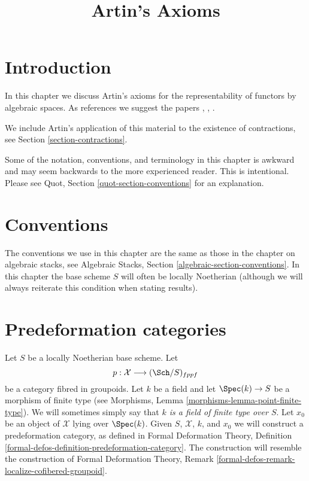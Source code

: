 

%


\title{Artin's Axioms}

\maketitle

\label{section-phantom}

\tableofcontents




\section{Introduction}
\label{section-introduction}

\noindent
In this chapter we discuss Artin's axioms for the representability of
functors by algebraic spaces. As references we suggest the papers
\cite{ArtinI}, \cite{ArtinII}, \cite{ArtinVersal}.

\medskip\noindent
We include Artin's application of this material to the existence
of contractions, see Section \ref{section-contractions}.

\medskip\noindent
Some of the notation, conventions, and terminology in this chapter is awkward
and may seem backwards to the more experienced reader. This is intentional.
Please see Quot, Section \ref{quot-section-conventions} for an
explanation.






\section{Conventions}
\label{section-conventions}

\noindent
The conventions we use in this chapter are the same as those in the
chapter on algebraic stacks, see
Algebraic Stacks, Section \ref{algebraic-section-conventions}.
In this chapter the base scheme $S$ will often be locally Noetherian
(although we will always reiterate this condition when stating
results).





\section{Predeformation categories}
\label{section-predeformation-categories}

\noindent
Let $S$ be a locally Noetherian base scheme. Let
$$
p : \mathcal{X} \longrightarrow (\Sch/S)_{fppf}
$$
be a category fibred in groupoids. Let $k$ be a field
and let $\Spec(k) \to S$ be a morphism of finite type (see
Morphisms, Lemma \ref{morphisms-lemma-point-finite-type}). We will sometimes
simply say that {\it $k$ is a field of finite type over $S$}. Let
$x_0$ be an object of $\mathcal{X}$ lying over $\Spec(k)$.
Given $S$, $\mathcal{X}$, $k$, and $x_0$ we will construct a
predeformation category, as defined in
Formal Deformation Theory,
Definition \ref{formal-defos-definition-predeformation-category}.
The construction will resemble the construction of
Formal Deformation Theory,
Remark \ref{formal-defos-remark-localize-cofibered-groupoid}.

